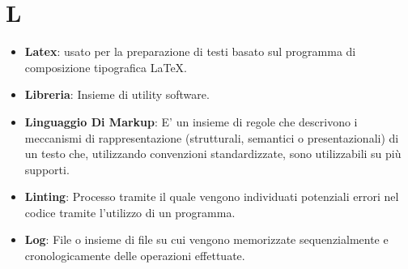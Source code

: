 \section*{L}
\begin{itemize}
	\item
	\textbf{Latex}:  usato per la preparazione di testi basato sul programma di composizione tipografica \LaTeX.
	\item
	\textbf{Libreria}: Insieme di utility software.
	\item
	\textbf{Linguaggio Di Markup}: E' un insieme di regole che descrivono i meccanismi di rappresentazione (strutturali, semantici o presentazionali) di un testo che, utilizzando convenzioni standardizzate, sono utilizzabili su più supporti.
	\item
	\textbf{Linting}: Processo tramite il quale vengono individuati potenziali errori nel codice tramite l'utilizzo di un programma.
	\item
	\textbf{Log}: File o insieme di file su cui vengono memorizzate sequenzialmente e cronologicamente delle operazioni effettuate.
\end{itemize}
\newpage